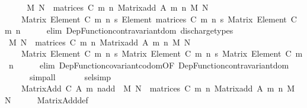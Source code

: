 \begin{isabellebody}
\ \ \isamarkupfalse%
\ \isamarkupfalse%
\ {\isachardoublequoteopen}{\isasymlambda}M\ N\ {\isasymin}\ matrices\ C\ m\ n{\isachardot}{\kern0pt}\ Matrix{\isacharunderscore}{\kern0pt}add\ A\ m\ n\ M\ N\ {\isacharcolon}{\kern0pt}\isanewline
\ \ \ \ Matrix\ {\isacharparenleft}{\kern0pt}Element\ C{\isacharparenright}{\kern0pt}\ m\ n\ {\isasymrightarrow}s\ Element\ {\isacharparenleft}{\kern0pt}matrices\ C\ m\ n{\isacharparenright}{\kern0pt}\ {\isasymrightarrow}s\ Matrix\ {\isacharparenleft}{\kern0pt}Element\ C{\isacharparenright}{\kern0pt}\ m\ n{\isachardoublequoteclose}\isanewline
\ \ \ \ \isamarkupfalse%
\ {\isacharparenleft}{\kern0pt}elim\ Dep{\isacharunderscore}{\kern0pt}Function{\isacharunderscore}{\kern0pt}contravariant{\isacharunderscore}{\kern0pt}dom{\isacharparenright}{\kern0pt}\ discharge{\isacharunderscore}{\kern0pt}types\isanewline
\ \ \isamarkupfalse%
\ \isamarkupfalse%
\ {\isachardoublequoteopen}{\isasymlambda}M\ N\ {\isasymin}\ matrices\ C\ m\ n{\isachardot}{\kern0pt}\ Matrix{\isacharunderscore}{\kern0pt}add\ A\ m\ n\ M\ N\ {\isacharcolon}{\kern0pt}\isanewline
\ \ \ \ Matrix\ {\isacharparenleft}{\kern0pt}Element\ C{\isacharparenright}{\kern0pt}\ m\ n\ {\isasymrightarrow}s\ Matrix\ {\isacharparenleft}{\kern0pt}Element\ C{\isacharparenright}{\kern0pt}\ m\ n\ {\isasymrightarrow}s\ Matrix\ {\isacharparenleft}{\kern0pt}Element\ C{\isacharparenright}{\kern0pt}\ m\ n{\isachardoublequoteclose}\isanewline
\ \ \ \ \isamarkupfalse%
\ {\isacharparenleft}{\kern0pt}elim\ Dep{\isacharunderscore}{\kern0pt}Function{\isacharunderscore}{\kern0pt}covariant{\isacharunderscore}{\kern0pt}codom{\isacharbrackleft}{\kern0pt}OF\ Dep{\isacharunderscore}{\kern0pt}Function{\isacharunderscore}{\kern0pt}contravariant{\isacharunderscore}{\kern0pt}dom{\isacharbrackright}{\kern0pt}{\isacharparenright}{\kern0pt}\isanewline
\ \ \ \ \ \ simp{\isacharunderscore}{\kern0pt}all\isanewline
\ \ \isanewline
\ \ \isamarkupfalse%
\ sel{\isacharunderscore}{\kern0pt}simp{\isacharcolon}{\kern0pt}\isanewline
\ \ \ \ {\isachardoublequoteopen}{\isacharparenleft}{\kern0pt}Matrix{\isacharunderscore}{\kern0pt}Add\ C\ A\ m\ n{\isacharparenright}{\kern0pt}{\isacharat}{\kern0pt}{\isacharat}{\kern0pt}add\ {\isacharequal}{\kern0pt}\ {\isasymlambda}M\ N\ {\isasymin}\ matrices\ C\ m\ n{\isachardot}{\kern0pt}\ Matrix{\isacharunderscore}{\kern0pt}add\ A\ m\ n\ M\ N{\isachardoublequoteclose}\isanewline
\ \ \ \ \isamarkupfalse%
\ Matrix{\isacharunderscore}{\kern0pt}Add{\isacharunderscore}{\kern0pt}def\ \isamarkupfalse%

\end{isabellebody}
